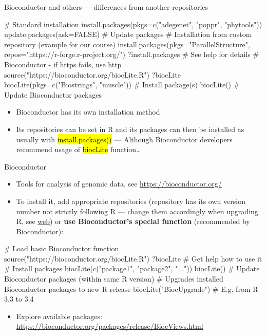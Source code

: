 \documentclass[compress, ucs, xelatex, 11pt, xcolor=svgnames,
  hyperref={
    bookmarks=true,
    unicode=true,
    colorlinks=true,
    pdftitle={Molecular data in R},
    plainpages=false,
    pdfauthor={Vojtech Zeisek},
    pdfsubject={Course about phylogeny and evolution in R},
    pdfcreator={XeLaTeX},
    pdfkeywords={R, evolution, phylogeny, molecular data},
    linkcolor=Tomato,
    anchorcolor=SaddleBrown,
    citecolor=Goldenrod,
    filecolor=DarkMagenta,
    menucolor=Sienna,
    urlcolor=DarkTurquoise,
    pdftex},
  url={hyphens, lowtilde} %
  ]{beamer}
\renewcommand{\texttt}[1]{\hl{\ttfamily #1}}
\begin{document}
\begin{frame}[fragile]{Bioconductor and others --- differences from another repositories}
  \label{sources-diff}
  \begin{spluscode}
    # Standard installation
    install.packages(pkgs=c("adegenet", "poppr", "phytools"))
    update.packages(ask=FALSE) # Update packages
    # Installation from custom repository (example for our course)
    install.packages(pkgs="ParallelStructure",
      repos="https://r-forge.r-project.org/")
    ?install.packages # See help for details
    # Bioconductor - if https fails, use http
    source("https://bioconductor.org/biocLite.R")
    ?biocLite
    biocLite(pkgs=c("Biostrings", "muscle")) # Install package(s)
    biocLite() # Update Bioconductor packages
  \end{spluscode}
  \begin{itemize}
    \item Bioconductor has its own installation method
    \item Its repositories can be set in R and its packages can then be installed as usually with \texttt{install.packages()} --- Although Bioconductor developers recommend usage of \texttt{biocLite} function\ldots
  \end{itemize}
\end{frame}

\begin{frame}[fragile]{Bioconductor}
  \label{bioc}
  \begin{itemize}
    \item Tools for analysis of genomic data, see \url{https://bioconductor.org/}
    \item To install it, add appropriate repositories (repository has its own version number not strictly following R --- change them accordingly when upgrading R, see \href{https://bioconductor.org/install/#bioc-version}{web}) or \textbf{use Bioconductor's special function} (recommended by Bioconductor):
  \end{itemize}
  \begin{spluscode}
    # Load basic Bioconductor function
    source("https://bioconductor.org/biocLite.R")
    ?biocLite # Get help how to use it
    # Install packages
    biocLite(c("package1", "package2", "..."))
    biocLite() # Update Bioconductor packages (within same R version)
    # Upgrades installed Bioconductor packages to new R release
    biocLite("BiocUpgrade") # E.g. from R 3.3 to 3.4
  \end{spluscode}
  \begin{itemize}
    \item Explore available packages: \url{https://bioconductor.org/packages/release/BiocViews.html}
  \end{itemize}
\end{frame}
\end{document}

